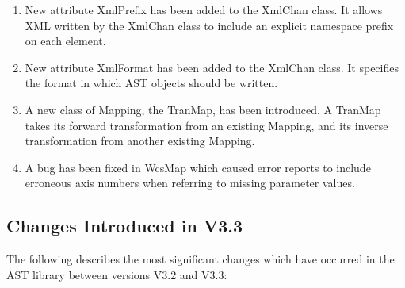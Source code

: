 \documentclass[twoside,11pt]{article}
\begin{document}
\begin{enumerate}
\item New attribute XmlPrefix has been added to the XmlChan class. It
allows XML written by the XmlChan class to include an explicit namespace
prefix on each element.

\item New attribute XmlFormat has been added to the XmlChan class. It
specifies the format in which AST objects should be written.

\item A new class of Mapping, the TranMap, has been introduced. A TranMap
takes its forward transformation from an existing Mapping, and its inverse
transformation from another existing Mapping.

\item A bug has been fixed in WcsMap which caused error reports to
include erroneous axis numbers when referring to missing parameter values.

\end{enumerate}

\subsection{Changes Introduced in V3.3}

The following describes the most significant changes which have
occurred in the AST library between versions V3.2 and V3.3:
\end{document}
